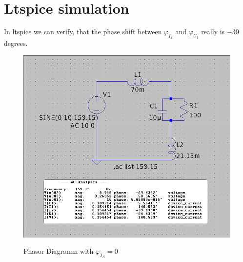 \documentclass[a4paper]{article}
\begin{document}
\clearpage
\section{Ltspice simulation}
In ltspice we can verify, that the phase shift between $\varphi_{I_{x}}$ and $\varphi_{U_{1}}$
really is $-30$ degrees. \\
\begin{figure}[h!]
	\centering
	\includegraphics[scale=0.55]{./Figures/assignment5_sim_aclist.png}
	\label{sim_1}
	\caption{Phasor Diagramm with $\varphi_{I_{R}} = 0$}
\end{figure}
\end{document}
